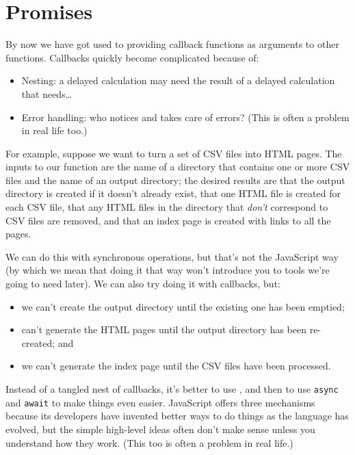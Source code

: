 \chapter{Promises}\label{s:promises}

By now we have got used to providing callback functions as arguments to other
functions.
Callbacks quickly become complicated because of:

\begin{itemize}
\item
  Nesting: a delayed calculation may need the result of a delayed calculation that needs\ldots{}
\item
  Error handling: who notices and takes care of errors?
  (This is often a problem in real life too.)
\end{itemize}

For example,
suppose we want to turn a set of CSV files into HTML pages.
The inputs to our function are the name of a directory that contains one or more CSV files
and the name of an output directory;
the desired results are
that the output directory is created if it doesn't already exist,
that one HTML file is created for each CSV file,
that any HTML files in the directory that \emph{don't} correspond to CSV files are removed,
and that an index page is created with links to all the pages.

We can do this with synchronous operations,
but that's not the JavaScript way
(by which we mean that doing it that way won't introduce you to tools we're going to need later).
We can also try doing it with callbacks, but:

\begin{itemize}
\item
  we can't create the output directory until the existing one has been emptied;
\item
  can't generate the HTML pages until the output directory has been re-created; and
\item
  we can't generate the index page until the CSV files have been processed.
\end{itemize}

Instead of a tangled nest of callbacks,
it's better to use ,
and then to use \texttt{async} and \texttt{await} to make things even easier.
JavaScript offers three mechanisms because
its developers have invented better ways to do things as the language has evolved,
but the simple high-level ideas often don't make sense unless you understand how they work.
(This too is often a problem in real life.)

